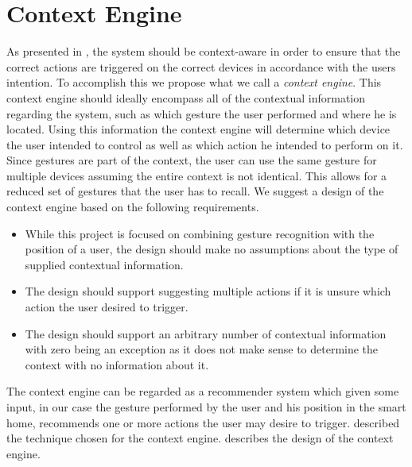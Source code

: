 \section{Context Engine}
\label{sec:analysis:context-engine}

As presented in , the system should be context-aware in order to ensure that the correct actions are triggered on the correct devices in accordance with the users intention.
To accomplish this we propose what we call a \emph{context engine}.
This context engine should ideally encompass all of the contextual information regarding the system, such as which gesture the user performed and where he is located.
Using this information the context engine will determine which device the user intended to control as well as which action he intended to perform on it.
Since gestures are part of the context, the user can use the same gesture for multiple devices assuming the entire context is not identical.
This allows for a reduced set of gestures that the user has to recall.
We suggest a design of the context engine based on the following requirements.

\begin{itemize}
\item While this project is focused on combining gesture recognition with the position of a user, the design should make no assumptions about the type of supplied contextual information.
\item The design should support suggesting multiple actions if it is unsure which action the user desired to trigger.
\item The design should support an arbitrary number of contextual information with zero being an exception as it does not make sense to determine the context with no information about it.
\end{itemize}

The context engine can be regarded as a recommender system which given some input, in our case the gesture performed by the user and his position in the smart home, recommends one or more actions the user may desire to trigger.  described the technique chosen for the context engine.  describes the design of the context engine.

